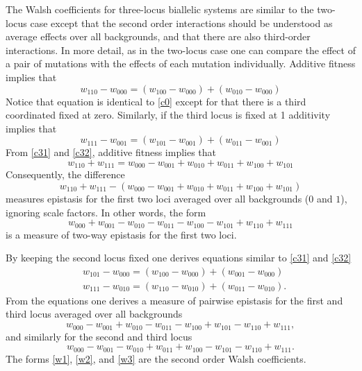 \documentclass[12pt]{amsart}
\theoremstyle{plain}
\theoremstyle{definition}
\begin{document}
The Walsh coefficients for three-locus biallelic systems 
are similar to the two-locus case except that 
the second order interactions should be understood as average
effects over all backgrounds, and 
that there are also  third-order interactions. 
In more detail, as in the two-locus case one can compare
the effect of a pair of  mutations with the effects of each mutation
individually.
Additive fitness implies that
\begin{equation}\label{c31}
w_{110}-w_{000}=(w_{100}-w_{000})+(w_{010}-w_{000})
\end{equation}
Notice that equation is identical to \ref{c0} except for that there is a third
coordinated fixed at zero.
Similarly, if the third locus is fixed at 1 additivity implies that
\begin{equation}\label{c32}
w_{111}-w_{001}=(w_{101}-w_{001})+(w_{011}-w_{001})
\end{equation}
From \ref{c31} and \ref{c32}, additive fitness implies that
\[
w_{110} +w_{111}= w_{000}-w_{001}+w_{010}+w_{011}+w_{100}+w_{101}
\]
Consequently, the difference 
\[
w_{110} +w_{111}-(w_{000}-w_{001}+w_{010}+w_{011}+w_{100}+w_{101})
\]
measures epistasis for the first two loci averaged over all backgrounds ($0$ and $1$),
ignoring scale factors.
In other words, the form \begin{equation}\label{w1}
w_{000}+w_{001}-w_{010}-w_{011}-w_{100} -w_{101}+w_{110} + w_{111} 
\end{equation}
is a measure of two-way epistasis for the first two loci.


By keeping the second locus fixed one derives equations similar to \ref{c31} and \ref{c32}
\begin{align*} 
& w_{101}-w_{000}=( w_{100}-w_{000})+(w_{001}-w_{000} )  \\
& w_{111}- w_{010}=(w_{110}-w_{010})+ (w_{011} - w_{010}).
\end{align*}
From the equations one derives a measure of pairwise epistasis for the first and third locus
averaged over all backgrounds
\begin{equation}\label{w2}
w_{000}-w_{001}+w_{010}-w_{011}-w_{100} +w_{101}-w_{110} + w_{111},
\end{equation}
and similarly for the second and third locus 
\begin{equation}\label{w3}
w_{000}-w_{001}-w_{010}+w_{011}+w_{100} -w_{101}-w_{110} + w_{111}.
\end{equation}
The forms \ref{w1}, \ref{w2}, and \ref{w3} are the second order Walsh coefficients.
\end{document}
